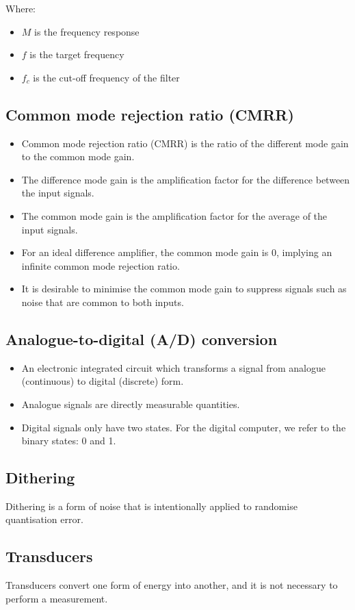 \documentclass[11pt]{article}
\begin{document}
Where:
\begin{itemize}
\item \(M\) is the frequency response
\item \(f\) is the target frequency
\item \(f_c\) is the cut-off frequency of the filter
\end{itemize}
\subsection{Common mode rejection ratio (CMRR)}
\label{sec:org184e67d}
\begin{itemize}
\item Common mode rejection ratio (CMRR) is the ratio of the different mode gain to the common mode gain.
\item The difference mode gain is the amplification factor for the difference between the input signals.
\item The common mode gain is the amplification factor for the average of the input signals.
\item For an ideal difference amplifier, the common mode gain is 0, implying an infinite common mode rejection ratio.
\item It is desirable to minimise the common mode gain to suppress signals such as noise that are common to both inputs.
\end{itemize}
\subsection{Analogue-to-digital (A/D) conversion}
\label{sec:orgb5c13fc}
\begin{itemize}
\item An electronic integrated circuit which transforms a signal from analogue (continuous) to digital (discrete) form.
\item Analogue signals are directly measurable quantities.
\item Digital signals only have two states. For the digital computer, we refer to the binary states: 0 and 1.
\end{itemize}
\subsection{Dithering}
\label{sec:orgac21a90}
Dithering is a form of noise that is intentionally applied to randomise quantisation error.
\subsection{Transducers}
\label{sec:orgc788fcf}
Transducers convert one form of energy into another, and it is not necessary to perform a measurement.
\end{document}
